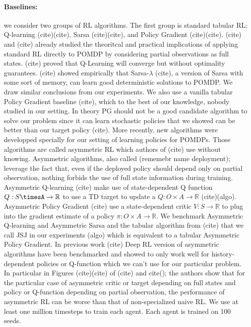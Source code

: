 \paragraph{Baselines:} we consider two groups of RL algorithms. The first group is standard tabular RL; Q-learning (cite)(cite), Sarsa (cite)(cite), and Policy Gradient (cite)(cite).
(cite) and (cite) already studied the theoritcal and practical implications of applying standard RL directly to POMDP by considering partial observations as full states.
(cite) proved that Q-Learning will converge but without optimality guarantees. 
(cite) showed empirically that Sarsa-$\lambda$ (cite), a version of Sarsa with some sort of memory, can learn good deterministic solutions to POMDP.
We draw similar conclusions from our experiments. 
We also use a vanilla tabular Policy Gradient baseline (cite), which to the best of our knowledge, nobody studied in our setting.
In theory PG should not be a good candidate algorithm to solve our problem since it can learn stochastic policies that we showed can be better than our target policy (cite).
More recently, new algorithms were developped specially for our setting of learning policies for POMDPs. Those algorithms are called asymmetric RL which authors of (cite) use without knowing. 
Asymmetric algorithms, also called (rememebr name deployment); leverage the fact that, even if the deployed policy should depend only on partial observation, nothing forbids the use of full state information during training.
Asymmetric Q-learning (cite) make use of state-dependent Q function $Q:S\timesA \rightarrow \mathbb{R}$ to use a TD target to update a $Q:O\times A\rightarrow \mathbb{R}$ (cite)(algo).    
Asymmetric Policy Gradient (cite) use a state-dependent critic $V:S\rightarrow \mathbb{R}$ to plug into the gradient estimate of a policy $\pi:O\times A \rightarrow \mathbb{R}$.
We benchmark Asymmetric Q-learning and Asymmetric Sarsa and the tabular algorithm from (cite) that we call JSJ in our experiments (algo) which is equivalent to a tabular Asymmetric Policy Gradient.
In previous work (cite) Deep RL version of asymmetric algorithms have been benchmarked and showed to only work well for history-dependent policies or Q-function which we can't use for our particular problem.
In particular in Figures (cite)(cite) of (cite) and cite(); the authors show that for the particular case of asymmetric critic or target depending on full states and policy or Q-function depending on partial observation, the performance of asymmetric RL can be worse than that of non-specialized naive RL.
We use at least one million timesteps to train each agent. Each agent is trained on 100 seeds.  

